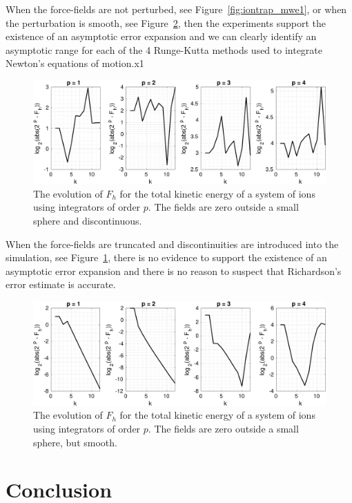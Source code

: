 \documentclass[runningheads]{llncs}
\begin{document}
When the force-fields are not perturbed, see Figure~\ref{fig:iontrap_mwe1}, or when the perturbation is smooth, see Figure~\ref{fig:iontrap_mwe4}, then the experiments support the existence of an asymptotic error expansion and we can clearly identify an asymptotic range for each of the 4 Runge-Kutta methods used to integrate Newton's equations of motion.x1
\begin{figure}[h!]
  \centering
  \includegraphics[width=\linewidth]{iontrap_mwe2.pdf}
  \caption{The evolution of $F_h$ for the total kinetic energy of a system of ions using integrators of order $p$. The fields are zero outside a small sphere and discontinuous.}
  \label{fig:iontrap_mwe2}
\end{figure}
When the force-fields are truncated and discontinuities are introduced into the simulation, see Figure~\ref{fig:iontrap_mwe2}, there is no evidence to support the existence of an asymptotic error expansion and there is no reason to suspect that Richardson's error estimate is accurate.
\begin{figure}
  \centering
  \includegraphics[width=\linewidth]{iontrap_mwe4.pdf}
  \caption{The evolution of $F_h$ for the total kinetic energy of a system of ions using integrators of order $p$. The fields are zero outside a small sphere, but smooth.}
  \label{fig:iontrap_mwe4}
\end{figure}


\section{Conclusion}
\end{document}
